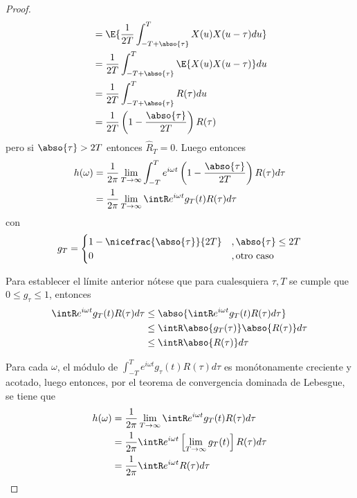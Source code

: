 \begin{proof}
\begin{align*}
&=
\E{ \frac{1}{2T} \int_{-T+\abso{\tau}}^{T} X(u) X(u-\tau) du } \\
&=
\frac{1}{2T} \int_{-T+\abso{\tau}}^{T} \E{X(u) X(u-\tau)} du \\
&=
\frac{1}{2T} \int_{-T+\abso{\tau}}^{T} R(\tau) du \\
&=
\frac{1}{2T} \left( 1 - \frac{\abso{\tau}}{2T} \right) R(\tau)
\end{align*}
pero si $\abso{\tau}>2T$ entonces $\widehat{R}_T = 0$. Luego entonces
\begin{align*}
h(\omega) &=
\frac{1}{2\pi} \lim_{T\rightarrow \infty}
\int_{-T}^{T} e^{i \omega t} \left( 1 - \frac{\abso{\tau}}{2T} \right) R(\tau) d\tau\\
&=
\frac{1}{2\pi} \lim_{T\rightarrow \infty}
\intR e^{i \omega t} g_T(t) R(\tau) d\tau
\end{align*}
con
\begin{equation}
g_T = \begin{cases}
1 - \nicefrac{\abso{\tau}}{2T} &, \abso{\tau} \leq 2T \\
0 &, \text{otro caso}
\end{cases}
\end{equation}

Para establecer el límite anterior nótese que para cualesquiera $\tau, T$ se cumple que $0\leq g_\tau \leq 1$, entonces
\begin{align*}
\intR e^{i \omega t} g_T(t) R(\tau) d\tau
&\leq
\abso{\intR e^{i \omega t} g_T(t) R(\tau) d\tau } \\
&\leq
\intR \abso{g_T(\tau)} \abso{ R(\tau)} d\tau \\
&\leq
\intR \abso{ R(\tau)} d\tau 
\end{align*}

Para cada $\omega$, el módulo de $\int_{-T}^{T} e^{i \omega t} g_\tau(t) R(\tau) d\tau$ es monótonamente creciente y acotado, luego entonces, por el teorema de convergencia dominada de Lebesgue, se tiene que
\begin{align*}
h(\omega) &=
\frac{1}{2\pi} \lim_{T\rightarrow \infty}
\intR e^{i \omega t} g_T(t) R(\tau) d\tau\\
&=
\frac{1}{2\pi} 
\intR e^{i \omega t} \left[ \lim_{T\rightarrow \infty} g_T(t) \right] R(\tau) d\tau\\
&=
\frac{1}{2\pi} 
\intR e^{i \omega t} R(\tau) d\tau\\
\end{align*}
\end{proof}

